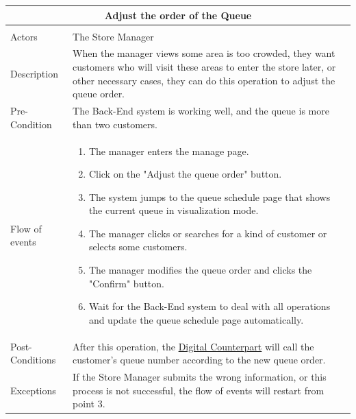 \documentclass[a4paper,12pt]{report}
\begin{document}
\begin{center}
	\begin{tabular}{p{}|p{}}
		\multicolumn{2}{c}{\large \textbf{Adjust the order of the Queue}} \\[3mm] 
		\hline \\
		Actors & The Store Manager  \\[3mm] 
		Description & When the manager views some area is too crowded, they want customers who will visit these areas to enter the store later, or other necessary cases, they can do this operation to adjust the queue order.  \\[3mm]  
		Pre-Condition &  The Back-End system is working well, and the queue is more than two customers. \\[3mm] 
		Flow of events & 
		\begin{enumerate}
			\item The manager enters the manage page.
			\item Click on the "Adjust the queue order" button.
			\item The system jumps to the queue schedule page that shows the current queue in visualization mode.
			\item The manager clicks or searches for a kind of customer or selects some customers.
			\item The manager modifies the queue order and clicks the "Confirm" button.
			\item Wait for the Back-End system to deal with all operations and update the queue schedule page automatically.
		\end{enumerate}
		\\[3mm] 
		Post-Conditions & After this operation, the \hyperref[Definitions]{Digital Counterpart} will call the customer's queue number according to the new queue order.\\[3mm] 
		Exceptions & If the Store Manager submits the wrong information, or this process is not successful, the flow of events will restart from point 3.
		\\[3mm] 
	\end{tabular}
\end{center}
\end{document}
